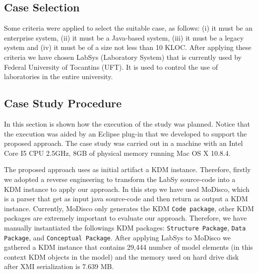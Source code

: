 \subsection{Case Selection}

Some criteria were applied to select the suitable case, as follows: (i) it must be an enterprise system, (ii) it must be a Java-based system, (iii) it must be a legacy system and (iv) it must be of a size not less than 10 KLOC. After applying these criteria we have chosen LabSys (Laboratory System) that is currently used by Federal University of Tocantins (UFT). It is used to control the use of laboratories in the entire university. 

\subsection{Case Study Procedure}\label{sec:caseStudyProcedure}

In this section is shown how the execution of the study was planned. Notice that the execution was aided by an Eclipse plug-in that we developed to support the proposed approach. The case study was carried out in a machine with an Intel Core I5 CPU 2.5GHz, 8GB of physical memory running Mac OS X 10.8.4.

The proposed approach uses as initial artifact a KDM instance. Therefore, firstly we adopted a reverse engineering to  transform the LabSy source-code into a KDM instance to apply our approach. In this step we have used MoDisco\cite{Brunele20141012}, which is a parser that get as input java source-code and then return as output a KDM instance. Currently, MoDisco only generates the KDM \texttt{Code package}, other KDM packages are extremely important to evaluate our approach. Therefore, we have manually instantiated the followings KDM packages: \texttt{Structure Package}, \texttt{Data Package}, and \texttt{Conceptual Package}. After applying LabSys to MoDisco we gathered a KDM instance that contains 29,444 number of model elements (in this context KDM objects in the model) and the memory used on hard drive disk after XMI serialization is 7.639 MB. 


